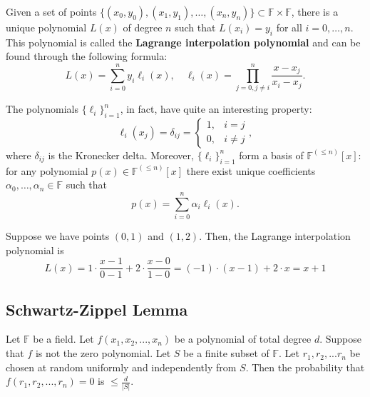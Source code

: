 \documentclass[../lecture-notes-148x210.tex]{subfiles}
\begin{document}
\begin{theorem}
    Given a set of points $\{(x_0,y_0),(x_1,y_1),\dots,(x_n,y_n)\} \subset
    \mathbb{F} \times \mathbb{F}$, there is a unique polynomial $L(x)$ of degree
    $n$ such that $L(x_i) = y_i$ for all $i=0,\dots,n$. This polynomial is
    called the \textbf{Lagrange interpolation polynomial} and can be found
    through the following formula:
    \begin{equation*}
        L(x) = \sum_{i=0}^{n} y_i \ell_i(x), \quad \ell_i(x) = \prod_{j=0, j \neq i}^{n} \frac{x-x_j}{x_i-x_j}.
    \end{equation*}  
\end{theorem}

\begin{lemma}
    The polynomials $\{\ell_i\}_{i=1}^n$, in fact, have quite an interesting property:
    \begin{equation*}
        \ell_i(x_j) = \delta_{ij} = \begin{cases}
            1, & i = j \\ 0, & i \neq j
        \end{cases},
    \end{equation*}
    where $\delta_{ij}$ is the Kronecker delta. Moreover, $\{\ell_i\}_{i=1}^n$ form a basis of $\mathbb{F}^{(\leq n)}[x]$: for any polynomial $p(x) \in \mathbb{F}^{(\leq n)}[x]$ there exist unique coefficients $\alpha_0,\dots,\alpha_n \in \mathbb{F}$ such that
    \begin{equation*}
        p(x) = \sum_{i=0}^{n} \alpha_i \ell_i(x).
    \end{equation*}
\end{lemma}

\begin{example}
    Suppose we have points $(0,1)$ and $(1,2)$. Then, the Lagrange interpolation polynomial is
    \begin{equation*}
        L(x) = 1 \cdot \frac{x-1}{0-1} + 2 \cdot \frac{x-0}{1-0} = (-1) \cdot (x-1) + 2 \cdot x = x + 1
    \end{equation*}
\end{example}

\subsection{Schwartz-Zippel Lemma}

\begin{lemma}\label{lemma:sz}
Let $\mathbb{F}$ be a field. Let $f(x_1, x_2, ..., x_n)$ be a polynomial of total degree $d$. Suppose that $f$ is not the zero polynomial. Let $S$ be
a finite subset of $\mathbb{F}$. Let $r_1, r_2, ... r_n$ be chosen at random uniformly and independently from $S$. Then the probability that 
$f(r_1, r_2, ..., r_n) = 0$ is $\le \frac{d}{|S|}$.
\end{lemma}
\end{document}
